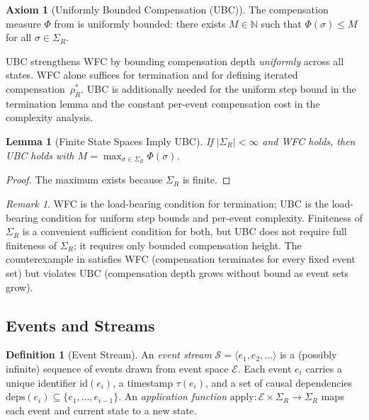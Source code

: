 \documentclass[11pt,a4paper]{article}
\theoremstyle{plain}
\newtheorem{lemma}[theorem]{Lemma}
\theoremstyle{definition}
\newtheorem{definition}[theorem]{Definition}
\newtheorem{axiom}[theorem]{Axiom}
\theoremstyle{remark}
\newtheorem{remark}[theorem]{Remark}
\begin{document}
\begin{axiom}[Uniformly Bounded Compensation (UBC)]
\label{ax:ubc}
The compensation measure $\Phi$ from  is uniformly bounded:
there exists $M \in \mathbb{N}$ such that $\Phi(\sigma) \leq M$ for all
$\sigma \in \Sigma_R$.
\end{axiom}

UBC strengthens WFC by bounding compensation depth \emph{uniformly} across
all states.  WFC alone suffices for termination and for defining iterated
compensation~$\rho_R^*$.  UBC is additionally needed for the uniform
step bound in the termination lemma and the constant per-event compensation
cost in the complexity analysis.

\begin{lemma}[Finite State Spaces Imply UBC]
\label{lem:finite-implies-ubc}
If $|\Sigma_R| < \infty$ and WFC holds, then UBC holds with
$M = \max_{\sigma \in \Sigma_R} \Phi(\sigma)$.
\end{lemma}
\begin{proof}
The maximum exists because $\Sigma_R$ is finite.
\end{proof}

\begin{remark}
WFC is the load-bearing condition for termination; UBC is the load-bearing
condition for uniform step bounds and per-event complexity.  Finiteness of
$\Sigma_R$ is a convenient sufficient condition for both, but UBC does not
require full finiteness of $\Sigma_R$; it requires only bounded compensation
height.  The counterexample
in  satisfies WFC (compensation terminates for every fixed
event set) but violates UBC (compensation depth grows without bound as event
sets grow).
\end{remark}

\subsection{Events and Streams}

\begin{definition}[Event Stream]
\label{def:stream}
An \emph{event stream} $\mathcal{S} = \langle e_1, e_2, \ldots \rangle$ is a
(possibly infinite) sequence of events drawn from event space $\mathcal{E}$.
Each event $e_i$ carries a unique identifier $\mathrm{id}(e_i)$, a timestamp
$\tau(e_i)$, and a set of causal dependencies
$\mathrm{deps}(e_i) \subseteq \{e_1, \ldots, e_{i-1}\}$.  An
\emph{application function}
$\mathrm{apply}: \mathcal{E} \times \Sigma_R \to \Sigma_R$ maps each event
and current state to a new state.
\end{definition}
\end{document}
